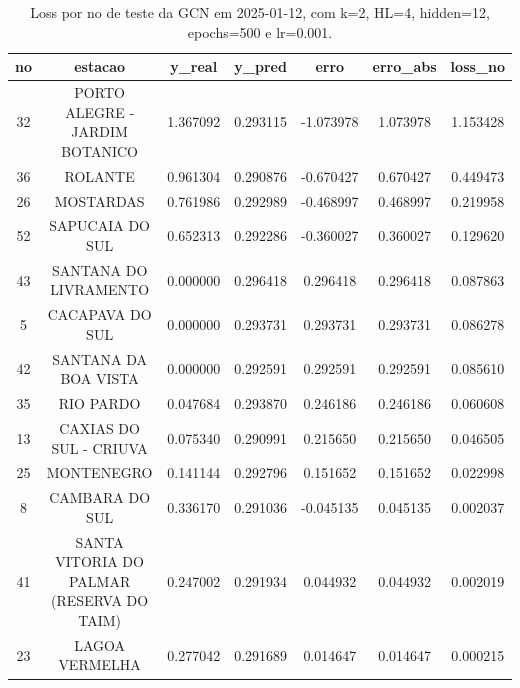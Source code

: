 \begin{table}[h]
\centering
\caption{Loss por no de teste da GCN em 2025-01-12, com k=2, HL=4, hidden=12, epochs=500 e lr=0.001.}
\label{tab:gcn_loss_k2_hl4_h12_e500_d20250112}
\begin{tabular}{ccccccc}
\toprule
no & estacao & y\_real & y\_pred & erro & erro\_abs & loss\_no \\
\midrule
32 & PORTO ALEGRE - JARDIM BOTANICO & 1.367092 & 0.293115 & -1.073978 & 1.073978 & 1.153428 \\
36 & ROLANTE & 0.961304 & 0.290876 & -0.670427 & 0.670427 & 0.449473 \\
26 & MOSTARDAS & 0.761986 & 0.292989 & -0.468997 & 0.468997 & 0.219958 \\
52 & SAPUCAIA DO SUL & 0.652313 & 0.292286 & -0.360027 & 0.360027 & 0.129620 \\
43 & SANTANA DO LIVRAMENTO & 0.000000 & 0.296418 & 0.296418 & 0.296418 & 0.087863 \\
5 & CACAPAVA DO SUL & 0.000000 & 0.293731 & 0.293731 & 0.293731 & 0.086278 \\
42 & SANTANA DA BOA VISTA & 0.000000 & 0.292591 & 0.292591 & 0.292591 & 0.085610 \\
35 & RIO PARDO & 0.047684 & 0.293870 & 0.246186 & 0.246186 & 0.060608 \\
13 & CAXIAS DO SUL - CRIUVA & 0.075340 & 0.290991 & 0.215650 & 0.215650 & 0.046505 \\
25 & MONTENEGRO & 0.141144 & 0.292796 & 0.151652 & 0.151652 & 0.022998 \\
8 & CAMBARA DO SUL & 0.336170 & 0.291036 & -0.045135 & 0.045135 & 0.002037 \\
41 & SANTA VITORIA DO PALMAR (RESERVA DO TAIM) & 0.247002 & 0.291934 & 0.044932 & 0.044932 & 0.002019 \\
23 & LAGOA VERMELHA & 0.277042 & 0.291689 & 0.014647 & 0.014647 & 0.000215 \\
\bottomrule
\end{tabular}
\end{table}
